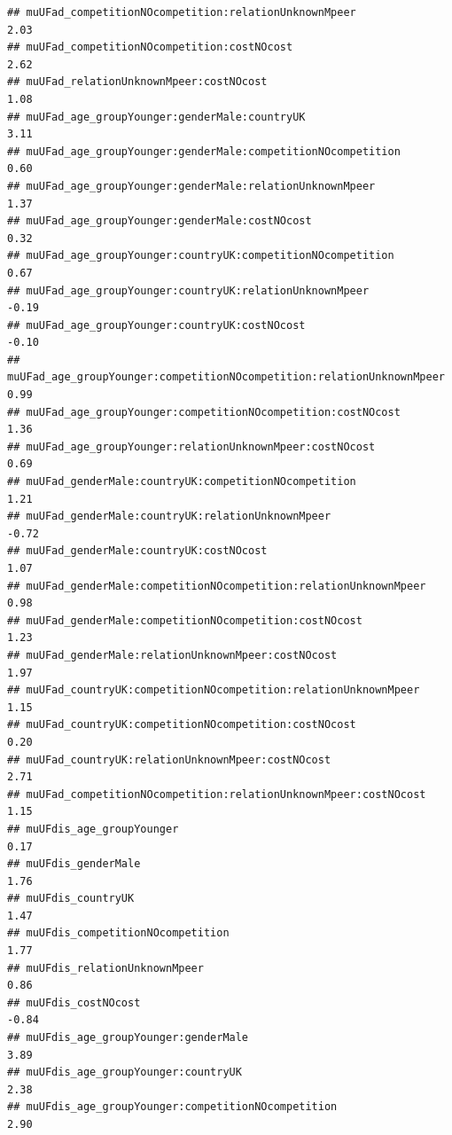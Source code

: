 \documentclass[
]{article}
\begin{document}
\begin{verbatim}
## muUFad_competitionNOcompetition:relationUnknownMpeer                       2.03
## muUFad_competitionNOcompetition:costNOcost                                 2.62
## muUFad_relationUnknownMpeer:costNOcost                                     1.08
## muUFad_age_groupYounger:genderMale:countryUK                               3.11
## muUFad_age_groupYounger:genderMale:competitionNOcompetition                0.60
## muUFad_age_groupYounger:genderMale:relationUnknownMpeer                    1.37
## muUFad_age_groupYounger:genderMale:costNOcost                              0.32
## muUFad_age_groupYounger:countryUK:competitionNOcompetition                 0.67
## muUFad_age_groupYounger:countryUK:relationUnknownMpeer                    -0.19
## muUFad_age_groupYounger:countryUK:costNOcost                              -0.10
## muUFad_age_groupYounger:competitionNOcompetition:relationUnknownMpeer      0.99
## muUFad_age_groupYounger:competitionNOcompetition:costNOcost                1.36
## muUFad_age_groupYounger:relationUnknownMpeer:costNOcost                    0.69
## muUFad_genderMale:countryUK:competitionNOcompetition                       1.21
## muUFad_genderMale:countryUK:relationUnknownMpeer                          -0.72
## muUFad_genderMale:countryUK:costNOcost                                     1.07
## muUFad_genderMale:competitionNOcompetition:relationUnknownMpeer            0.98
## muUFad_genderMale:competitionNOcompetition:costNOcost                      1.23
## muUFad_genderMale:relationUnknownMpeer:costNOcost                          1.97
## muUFad_countryUK:competitionNOcompetition:relationUnknownMpeer             1.15
## muUFad_countryUK:competitionNOcompetition:costNOcost                       0.20
## muUFad_countryUK:relationUnknownMpeer:costNOcost                           2.71
## muUFad_competitionNOcompetition:relationUnknownMpeer:costNOcost            1.15
## muUFdis_age_groupYounger                                                   0.17
## muUFdis_genderMale                                                         1.76
## muUFdis_countryUK                                                          1.47
## muUFdis_competitionNOcompetition                                           1.77
## muUFdis_relationUnknownMpeer                                               0.86
## muUFdis_costNOcost                                                        -0.84
## muUFdis_age_groupYounger:genderMale                                        3.89
## muUFdis_age_groupYounger:countryUK                                         2.38
## muUFdis_age_groupYounger:competitionNOcompetition                          2.90

\end{verbatim}
\end{document}
